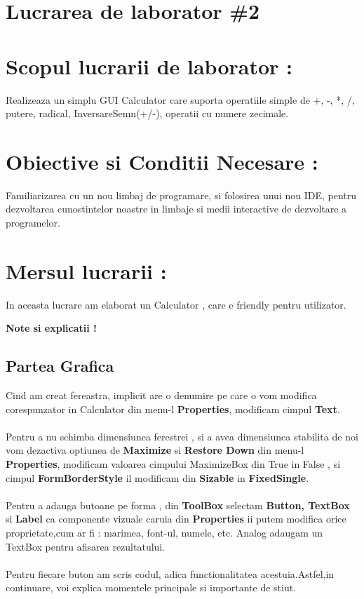 \section*{Lucrarea de laborator \#2}

\section{Scopul lucrarii de laborator :}
Realizeaza un simplu GUI Calculator care suporta operatiile simple de +, -, *, /, putere, radical, InversareSemn(+/-), operatii cu numere zecimale.

\section{Obiective si Conditii Necesare :}
Familiarizarea cu un nou limbaj de programare, si folosirea unui nou IDE, pentru dezvoltarea cunostintelor noastre in limbaje si medii interactive de dezvoltare a programelor.

\section{Mersul lucrarii :}
In aceasta lucrare am elaborat un Calculator , care e friendly pentru utilizator. 

\textbf{Note si explicatii !}
\subsection{Partea Grafica}
\tab Cind am creat fereastra, implicit are o denumire pe care o vom modifica corespunzator in Calculator din menu-l \textbf{Properties}, modificam cimpul \textbf{Text}. \\
\\
Pentru a nu schimba dimensiunea ferestrei , si a avea dimensiunea stabilita de noi vom dezactiva optiunea de \textbf{Maximize} si \textbf{Restore Down} din menu-l \textbf{Properties}, modificam valoarea cimpului MaximizeBox din True in False , si 
cimpul \textbf{FormBorderStyle} il modificam din \textbf{Sizable} in \textbf{FixedSingle}. \\
\\
Pentru a adauga butoane pe forma , din \textbf{ToolBox} selectam \textbf{Button, TextBox} si \textbf{Label} ca componente vizuale caruia din \textbf{Properties} ii putem modifica orice proprietate,cum ar fi : marimea, font-ul, numele, etc. Analog adaugam un TextBox pentru afisarea rezultatului. \\
\\
Pentru fiecare buton am scris codul, adica functionalitatea 
acestuia.Astfel,in continuare, voi explica momentele principale si importante de stiut.\\

